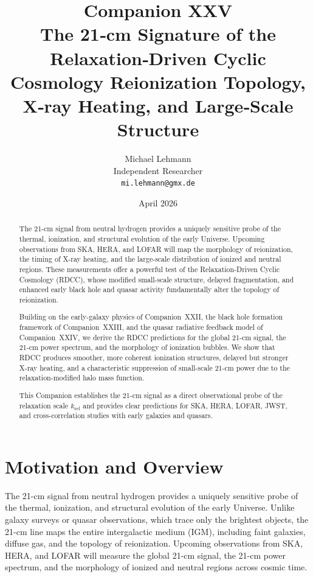 \documentclass[11pt,a4paper]{article}
\title{
\textbf{Companion XXV}\\[4mm]
\textbf{The 21‑cm Signature of the Relaxation‑Driven Cyclic Cosmology  
Reionization Topology, X‑ray Heating, and Large‑Scale Structure}}
\author{
Michael Lehmann\\
Independent Researcher\\
\texttt{mi.lehmann@gmx.de}
}
\date{April 2026}
\begin{document}
\maketitle

\begin{abstract}
The 21-cm signal from neutral hydrogen provides a uniquely sensitive probe of the thermal, 
ionization, and structural evolution of the early Universe. Upcoming observations from SKA, 
HERA, and LOFAR will map the morphology of reionization, the timing of X-ray heating, and the 
large-scale distribution of ionized and neutral regions. These measurements offer a powerful 
test of the Relaxation-Driven Cyclic Cosmology (RDCC), whose modified small-scale structure, 
delayed fragmentation, and enhanced early black hole and quasar activity fundamentally alter 
the topology of reionization.

Building on the early-galaxy physics of Companion~XXII, the black hole formation framework of 
Companion~XXIII, and the quasar radiative feedback model of Companion~XXIV, we derive the 
RDCC predictions for the global 21-cm signal, the 21-cm power spectrum, and the morphology of 
ionization bubbles. We show that RDCC produces smoother, more coherent ionization structures, 
delayed but stronger X-ray heating, and a characteristic suppression of small-scale 21-cm 
power due to the relaxation-modified halo mass function.

This Companion establishes the 21-cm signal as a direct observational probe of the relaxation 
scale $k_{\mathrm{rel}}$ and provides clear predictions for SKA, HERA, LOFAR, JWST, and 
cross-correlation studies with early galaxies and quasars.
\end{abstract}

\section{Motivation and Overview}

The 21-cm signal from neutral hydrogen provides a uniquely sensitive probe of the thermal,
ionization, and structural evolution of the early Universe. Unlike galaxy surveys or quasar
observations, which trace only the brightest objects, the 21-cm line maps the entire
intergalactic medium (IGM), including faint galaxies, diffuse gas, and the topology of
reionization. Upcoming observations from SKA, HERA, and LOFAR will measure the global
21-cm signal, the 21-cm power spectrum, and the morphology of ionized and neutral regions
across cosmic time.
\end{document}
